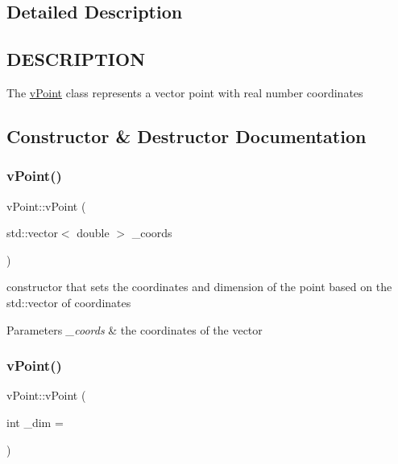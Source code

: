 \subsection{Detailed Description}
\hypertarget{function_8h_DESCRIPTION}{}\subsection{D\+E\+S\+C\+R\+I\+P\+T\+I\+ON}\label{function_8h_DESCRIPTION}
The \hyperlink{classv_point}{v\+Point} class represents a vector point with real number coordinates 

\subsection{Constructor \& Destructor Documentation}
\mbox{\label{classv_point_ab3ac707d0f2109ade8ee78a20b076e0d}} 
\subsubsection{\texorpdfstring{v\+Point()}{vPoint()}\hspace{0.1cm}{\footnotesize\ttfamily [1/2]}}
{\footnotesize\ttfamily v\+Point\+::v\+Point (\begin{DoxyParamCaption}\item[{std\+::vector$<$ double $>$}]{\+\_\+coords }\end{DoxyParamCaption})}

constructor that sets the coordinates and dimension of the point based on the std\+::vector of coordinates 
\begin{DoxyParams}{Parameters}
{\em \+\_\+coords} & the coordinates of the vector \\
\hline
\end{DoxyParams}
\mbox{\label{classv_point_ab08b85daf7ffc356d9241cd3f62acec9}} 
\subsubsection{\texorpdfstring{v\+Point()}{vPoint()}\hspace{0.1cm}{\footnotesize\ttfamily [2/2]}}
{\footnotesize\ttfamily v\+Point\+::v\+Point (\begin{DoxyParamCaption}\item[{int}]{\+\_\+dim = {} }\end{DoxyParamCaption})}

